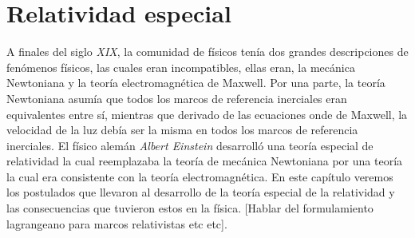 \documentclass[../main.tex]{subfiles}
\begin{document}
\chapter{Relatividad especial}
A finales del siglo \emph{XIX}, la comunidad de físicos tenía dos grandes descripciones de fenómenos físicos, las cuales eran incompatibles, ellas eran, la mecánica Newtoniana y la teoría electromagnética de Maxwell. Por una parte, la teoría Newtoniana asumía que todos los marcos de referencia inerciales eran equivalentes entre sí, mientras que derivado de las ecuaciones onde de Maxwell, la velocidad de la luz debía ser la misma en todos los marcos de referencia inerciales. El físico alemán \emph{Albert Einstein} desarrolló una teoría especial de relatividad la cual reemplazaba la teoría de mecánica Newtoniana  por una teoría la cual era consistente con la teoría electromagnética. En este capítulo veremos los postulados que llevaron al desarrollo de la teoría especial de la relatividad y las consecuencias que tuvieron estos en la física. [Hablar del formulamiento lagrangeano para marcos relativistas etc etc].
\end{document}
